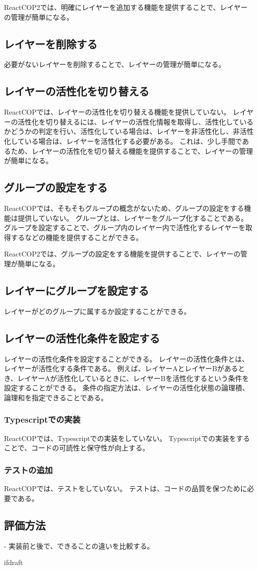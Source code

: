 \documentclass{jsarticle}
\begin{document}
ReactCOP2では、明確にレイヤーを追加する機能を提供することで、レイヤーの管理が簡単になる。

\subsection{レイヤーを削除する}
必要がないレイヤーを削除することで、レイヤーの管理が簡単になる。

\subsection{レイヤーの活性化を切り替える}
ReactCOPでは、レイヤーの活性化を切り替える機能を提供していない。
レイヤーの活性化を切り替えるには、レイヤーの活性化情報を取得し、活性化しているかどうかの判定を行い、活性化している場合は、レイヤーを非活性化し、非活性化している場合は、レイヤーを活性化する必要がある。
これは、少し手間であるため、レイヤーの活性化を切り替える機能を提供することで、レイヤーの管理が簡単になる。

\subsection{グループの設定をする}
ReactCOPでは、そもそもグループの概念がないため、グループの設定をする機能は提供していない。
グループとは、レイヤーをグループ化することである。
グループを設定することで、グループ内のレイヤー内で活性化するレイヤーを取得するなどの機能を提供することができる。

ReactCOP2では、グループの設定をする機能を提供することで、レイヤーの管理が簡単になる。

\subsection{レイヤーにグループを設定する}
レイヤーがどのグループに属するか設定することができる。

\subsection{レイヤーの活性化条件を設定する}
レイヤーの活性化条件を設定することができる。
レイヤーの活性化条件とは、レイヤーが活性化する条件である。
例えば、レイヤーAとレイヤーBがあるとき、レイヤーAが活性化しているときに、レイヤーBを活性化するという条件を設定することができる。
条件の指定方法は、レイヤーの活性化状態の論理積、論理和を指定できることである。

\subsubsection{Typescriptでの実装}
ReactCOPでは、Typescriptでの実装をしていない。
Typescriptでの実装をすることで、コードの可読性と保守性が向上する。

\subsubsection{テストの追加}
ReactCOPでは、テストをしていない。
テストは、コードの品質を保つために必要である。

\subsection{評価方法}
- 実装前と後で、できることの違いを比較する。

\expandafter\ifx\csname ifdraft\endcsname\relax
\end{document}
